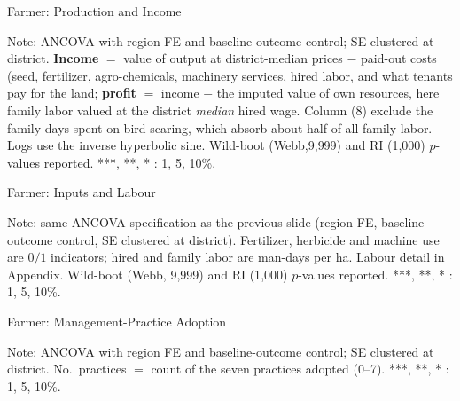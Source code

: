 \documentclass[aspectratio=169]{beamer}
\newcommand{\notefont}{\fontsize{5pt}{6pt}\selectfont}
\begin{document}
\begin{frame}{Farmer: Production and Income}
	\centering
	\begin{minipage}{0.94\textwidth}
		\notefont
		Note: ANCOVA with region FE and baseline-outcome control; SE clustered at district.
		\textbf{Income} $=$ value of output at district-median prices $-$ paid-out costs (seed, fertilizer, agro-chemicals, machinery services, hired labor, and what tenants pay for the land;
		\textbf{profit} $=$ income $-$ the imputed value of own resources, here family labor valued at the district \emph{median} hired wage. 
        Column (8) exclude the family days spent on bird scaring, which absorb about half of all family labor. 
        Logs use the inverse hyperbolic sine. 
        Wild-boot (Webb,9{,}999) and RI (1{,}000) $p$-values reported. 
        ***, **, * : 1, 5, 10\%.
	\end{minipage}
\end{frame}

\begin{frame}{Farmer: Inputs and Labour}
	\centering
	\begin{minipage}{0.94\textwidth}
		\notefont
		Note: same ANCOVA specification as the previous slide (region FE, baseline-outcome control, SE clustered at district). Fertilizer, herbicide and machine use are $0/1$ indicators; hired and family labor are man-days per ha. Labour detail in Appendix.
        Wild-boot (Webb, 9{,}999) and RI (1{,}000) $p$-values reported.
        ***, **, * : 1, 5, 10\%.
	\end{minipage}
\end{frame}

\begin{frame}{Farmer: Management-Practice Adoption}
	\centering
	\begin{minipage}{0.94\textwidth}
		\notefont
		Note: ANCOVA with region FE and baseline-outcome control; SE clustered at district.
		No.\ practices $=$ count of the seven practices adopted (0--7). 
        ***, **, * : 1, 5, 10\%.
	\end{minipage}
\end{frame}
\end{document}
